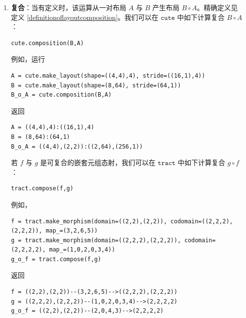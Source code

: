 \begin{enumerate}[left=0pt]
\item {\bf 复合}：当有定义时，该运算从一对布局 $A$ 与 $B$ 产生布局 $B \circ A$。精确定义见定义 \ref{definitionoflayoutcomposition}。我们可以在 $\texttt{cute}$ 中如下计算复合 $B \circ A$：
\begin{lstlisting}[language=cutedsl]
cute.composition(B,A)
\end{lstlisting}
例如，运行
\begin{lstlisting}[language=cutedsl]
A = cute.make_layout(shape=((4,4),4), stride=((16,1),4))
B = cute.make_layout(shape=(8,64), stride=(64,1))
B_o_A = cute.composition(B,A)
\end{lstlisting}
返回
\begin{lstlisting}[language=cutedsl]
A = ((4,4),4):((16,1),4)
B = (8,64):(64,1)
B_o_A = ((4,4),(2,2)):((2,64),(256,1))
\end{lstlisting}
若 $f$ 与 $g$ 是可复合的嵌套元组态射，我们可以在 $\texttt{tract}$ 中如下计算复合 $g \circ f$：
\begin{lstlisting}[language=cutedsl]
tract.compose(f,g)
\end{lstlisting}
例如，
\begin{lstlisting}[language=cutedsl]
f = tract.make_morphism(domain=((2,2),(2,2)), codomain=((2,2,2),(2,2,2)), map_=(3,2,6,5))
g = tract.make_morphism(domain=((2,2,2),(2,2,2)), codomain=(2,2,2,2), map_=(1,0,2,0,3,4))
g_o_f = tract.compose(f,g)
\end{lstlisting}
返回
\begin{lstlisting}[language=cutedsl]
f = ((2,2),(2,2))--(3,2,6,5)-->((2,2,2),(2,2,2))
g = ((2,2,2),(2,2,2))--(1,0,2,0,3,4)-->(2,2,2,2)
g_o_f = ((2,2),(2,2))--(2,0,4,3)-->(2,2,2,2)
\end{lstlisting}


\end{enumerate}
